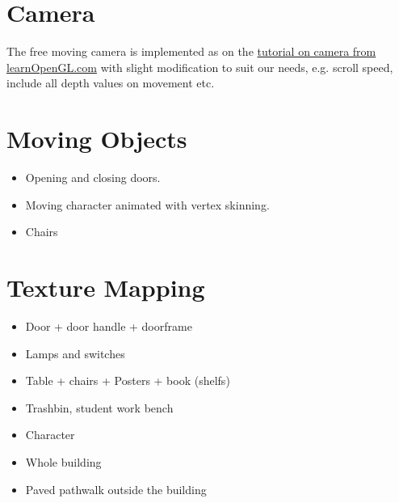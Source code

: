\documentclass[12pt]{article}
\begin{document}
\section{Camera}
The free moving camera is implemented as on the \href{http://www.learnopengl.com/#!Getting-started/Camera}{tutorial on camera from learnOpenGL.com} with slight modification to suit our needs, e.g. scroll speed, include all depth values on movement etc.

\section{Moving Objects}
\begin{itemize}
\item Opening and closing doors.
\item Moving character animated with vertex skinning.
\item Chairs
\end{itemize}

\section{Texture Mapping}
\begin{itemize}
\item Door + door handle + doorframe
\item Lamps and switches
\item Table + chairs + Posters + book (shelfs)
\item Trashbin, student work bench
\item Character
\item Whole building
\item Paved pathwalk outside the building
\end{itemize}
\end{document}
